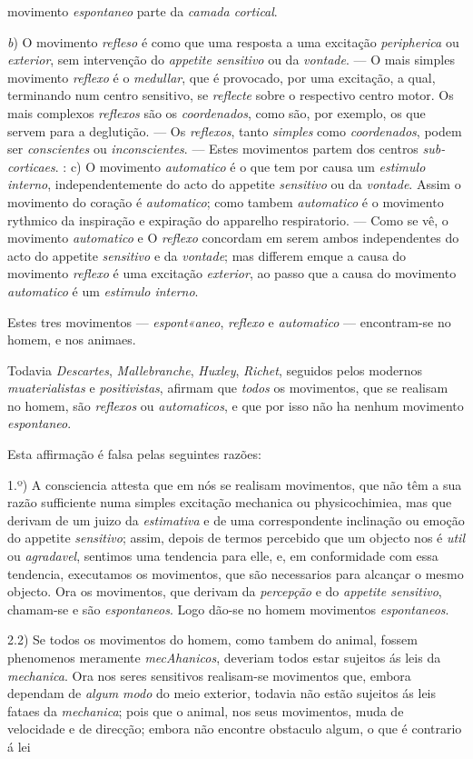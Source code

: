 movimento \emph{espontaneo} parte da \emph{camada cortical}.\par \emph{b}) O movimento \emph{refleso} é como que uma resposta a uma excitação \emph{peripherica} ou \emph{exterior}, sem intervenção do \emph{appetite sensitivo} ou da \emph{vontade}. --- O mais simples movimento \emph{reflexo} é o \emph{medullar}, que é provocado, por uma excitação, a qual, terminando num centro sensitivo, se \emph{reflecte} sobre o respectivo centro motor. Os mais complexos \emph{reflexos} são os \emph{coordenados}, como são, por exemplo, os que servem para a deglutição. --- Os \emph{reflexos}, tanto \emph{simples} como \emph{coordenados}, podem ser \emph{conscientes} ou \emph{inconscientes}. --- Estes movimentos partem dos centros \emph{sub-corticaes}. : c) O movimento \emph{automatico} é o que tem por causa um \emph{estimulo interno}, independentemente do acto do appetite \emph{sensitivo} ou da \emph{vontade}. Assim o movimento do coração é \emph{automatico}; como tambem \emph{automatico} é o movimento rythmico da inspiração e expiração do apparelho respiratorio. --- Como se vê, o movimento \emph{automatico} e O \emph{reflexo} concordam em serem ambos independentes do acto do appetite \emph{sensitivo} e da \emph{vontade}; mas differem emque a causa do movimento \emph{reflexo} é uma excitação \emph{exterior}, ao passo que a causa do movimento \emph{automatico} é um \emph{estimulo interno}.\par * Estes tres movimentos --- \emph{espont«aneo}, \emph{reflexo} e \emph{automatico} --- encontram-se no homem, e nos animaes.\par Todavia \emph{Descartes}, \emph{Mallebranche}, \emph{Huxley}, \emph{Richet}, seguidos pelos modernos \emph{muaterialistas} e \emph{positivistas}, afirmam que \emph{todos} os movimentos, que se realisam no homem, são \emph{reflexos} ou \emph{automaticos}, e que por isso não ha nenhum movimento \emph{espontaneo}.\par Esta affirmação é falsa pelas seguintes razões:\par 1.º) A consciencia attesta que em nós se realisam movimentos, que não têm a sua razão sufficiente numa simples excitação mechanica ou physicochimiea, mas que derivam de um juizo da \emph{estimativa} e de uma correspondente inclinação ou emoção do appetite \emph{sensitivo}; assim, depois de termos percebido que um objecto nos é \emph{util} ou \emph{agradavel}, sentimos uma tendencia para elle, e, em conformidade com essa tendencia, executamos os movimentos, que são necessarios para alcançar o mesmo objecto. Ora os movimentos, que derivam da \emph{percepção} e do \emph{appetite sensitivo}, chamam-se e são \emph{espontaneos}. Logo dão-se no homem movimentos \emph{espontaneos}.\par 2.2) Se todos os movimentos do homem, como tambem do animal, fossem phenomenos meramente \emph{mecAhanicos}, deveriam todos estar sujeitos ás leis da \emph{mechanica}. Ora nos seres sensitivos realisam-se movimentos que, embora dependam de \emph{algum modo} do meio exterior, todavia não estão sujeitos ás leis fataes da \emph{mechanica}; pois que o animal, nos seus movimentos, muda de velocidade e de direcção; embora não encontre obstaculo algum, o que é contrario á lei 